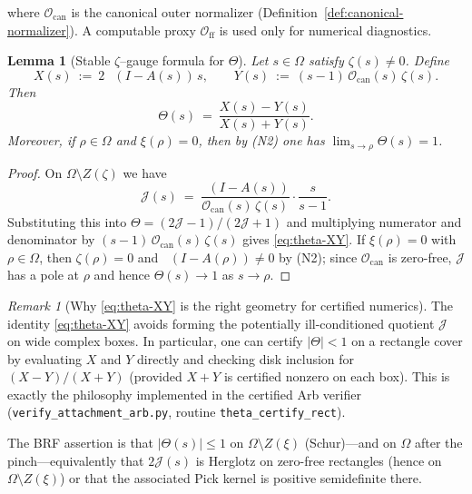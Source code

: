 \documentclass[11pt]{article}
\newtheorem{lemma}[theorem]{Lemma}
\theoremstyle{definition}
\theoremstyle{remark}
\newtheorem{remark}[theorem]{Remark}
\theoremstyle{definition}
\DeclareMathOperator{\dettwo}{det_2}
\begin{document}
where \(\mathcal O_{\mathrm{can}}\) is the canonical outer normalizer (Definition~\ref{def:canonical-normalizer}). A computable proxy \(\mathcal O_{\mathrm{ff}}\) is used only for numerical diagnostics.
\begin{lemma}[Stable $\zeta$--gauge formula for $\Theta$]\label{lem:theta-stable-zeta}
Let $s\in\Omega$ satisfy $\zeta(s)\neq 0$.
Define
\[
  X(s)\ :=\ 2\,\dettwo(I-A(s))\,s,
  \qquad
  Y(s)\ :=\ (s-1)\,\mathcal O_{\mathrm{can}}(s)\,\zeta(s).
\]
Then
\begin{equation}\label{eq:theta-XY}
  \Theta(s)\ =\ \frac{X(s)-Y(s)}{X(s)+Y(s)}.
\end{equation}
Moreover, if $\rho\in\Omega$ and $\xi(\rho)=0$, then by \textnormal{(N2)} one has $\lim_{s\to\rho}\Theta(s)=1$.
\end{lemma}
\begin{proof}
On $\Omega\setminus Z(\zeta)$ we have
\[
  \mathcal J(s)\ =\ \frac{\dettwo(I-A(s))}{\mathcal O_{\mathrm{can}}(s)\,\zeta(s)}\cdot\frac{s}{s-1}.
\]
Substituting this into $\Theta=(2\mathcal J-1)/(2\mathcal J+1)$ and multiplying numerator and denominator by $(s-1)\,\mathcal O_{\mathrm{can}}(s)\,\zeta(s)$ gives \eqref{eq:theta-XY}.
If $\xi(\rho)=0$ with $\rho\in\Omega$, then $\zeta(\rho)=0$ and $\dettwo(I-A(\rho))\neq 0$ by \textnormal{(N2)}; since $\mathcal O_{\mathrm{can}}$ is zero-free, $\mathcal J$ has a pole at $\rho$ and hence $\Theta(s)\to 1$ as $s\to\rho$.
\end{proof}
\begin{remark}[Why \eqref{eq:theta-XY} is the right geometry for certified numerics]\label{rem:theta-geometry}
The identity \eqref{eq:theta-XY} avoids forming the potentially ill-conditioned quotient $\mathcal J$ on wide complex boxes.
In particular, one can certify $|\Theta|<1$ on a rectangle cover by evaluating $X$ and $Y$ directly and checking disk inclusion for $(X-Y)/(X+Y)$ (provided $X+Y$ is certified nonzero on each box).
This is exactly the philosophy implemented in the certified Arb verifier (\texttt{verify\_attachment\_arb.py}, routine \texttt{theta\_certify\_rect}).
\end{remark}
The BRF assertion is that \(|\Theta(s)|\le 1\) on $\Omega\setminus Z(\xi)$ (Schur)—and on $\Omega$ after the pinch—equivalently that $2\mathcal J(s)$ is Herglotz on zero-free rectangles (hence on $\Omega\setminus Z(\xi)$) or that the associated Pick kernel is positive semidefinite there.
\end{document}
